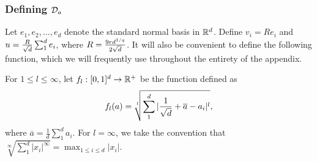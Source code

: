 \subsubsection{Defining ${\mathcal D}_a$}\label{subsubsec:D_a}

Let $e_1, e_2, \dots, e_d$ denote the standard normal basis in $\mathbb R^d$. Define $v_i = R e_i$ and $u = \frac{R}{\sqrt{d}} \sum_1^d e_i$, where $R = \frac{9rd^{1/q}}{2\sqrt{d}}$. It will also be convenient to define the following function, which we will frequently use throughout the entirety of the appendix.
\begin{defn}\label{defn:function_f}
For $1 \leq l \leq \infty$, let $f_l: [0,1]^d \to \mathbb R^+$ be the function defined as $$f_l(a) = \sqrt[l]{\sum_1^d|\frac{1}{\sqrt{d}} + \overline{a} - a_i|^l},$$ where $\overline{a} = \frac{1}{d}\sum_1^d a_i$. For $l = \infty$, we take the convention that $\sqrt[\infty]{\sum_1^d |x_i|^\infty} = \max_{1 \leq i \leq d} |x_i|.$ 
\end{defn}


